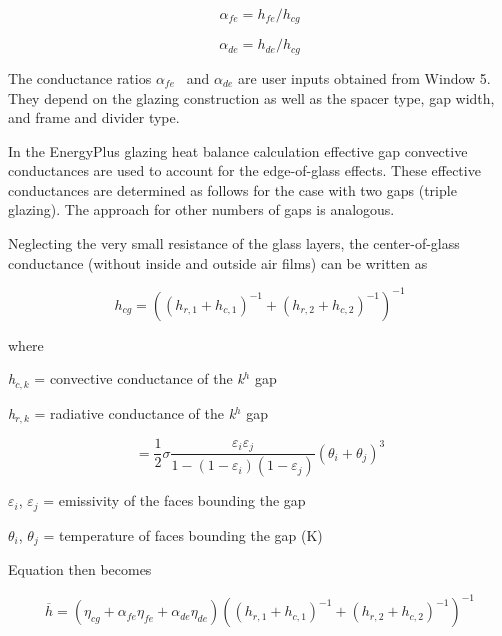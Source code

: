 \begin{equation}
{\alpha_{fe}} = {h_{fe}}/{h_{cg}}
\end{equation}

\begin{equation}
{\alpha_{de}} = {h_{de}}/{h_{cg}}
\end{equation}

The conductance ratios \({\alpha_{fe}}\) ~and \({\alpha_{de}}\) are user inputs obtained from Window 5. They depend on the glazing construction as well as the spacer type, gap width, and frame and divider type.

In the EnergyPlus glazing heat balance calculation effective gap convective conductances are used to account for the edge-of-glass effects. These effective conductances are determined as follows for the case with two gaps (triple glazing). The approach for other numbers of gaps is analogous.

Neglecting the very small resistance of the glass layers, the center-of-glass conductance (without inside and outside air films) can be written as

\begin{equation}
{h_{cg}} = {\left( {{{\left( {{h_{r,1}} + {h_{c,1}}} \right)}^{ - 1}} + {{\left( {{h_{r,2}} + {h_{c,2}}} \right)}^{ - 1}}} \right)^{ - 1}}
\end{equation}

where

\emph{h\(_{c,k}\)} = convective conductance of the \emph{k\(^{h}\)} gap

\emph{h\(_{r,k}\)} = radiative conductance of the \emph{k\(^{h}\)} gap

\begin{equation}
= \frac{1}{2}\sigma \frac{{{\varepsilon_i}{\varepsilon_j}}}{{1 - \left( {1 - {\varepsilon_i}} \right)\left( {1 - {\varepsilon_j}} \right)}}{\left( {{\theta_i} + {\theta_j}} \right)^3}
\end{equation}

$\varepsilon$\(_{i}\), $\varepsilon$\(_{j}\) = emissivity of the faces bounding the gap

$\theta$\(_{i}\), $\theta$\(_{j}\) = temperature of faces bounding the gap (K)

Equation then becomes

\begin{equation}
\overline h  = \left( {{\eta_{cg}} + {\alpha_{fe}}{\eta_{fe}} + {\alpha_{de}}{\eta_{de}}} \right){\left( {{{\left( {{h_{r,1}} + {h_{c,1}}} \right)}^{ - 1}} + {{\left( {{h_{r,2}} + {h_{c,2}}} \right)}^{ - 1}}} \right)^{ - 1}}
\end{equation}

